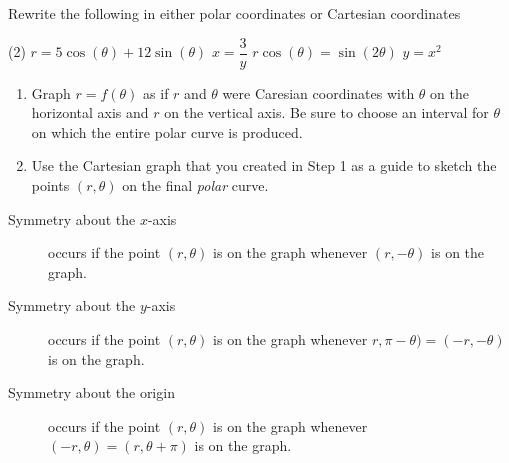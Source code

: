 \documentclass[../mathNotesPreamble]{subfiles}
\begin{document}
  \begin{ex*}
    Rewrite the following in either polar coordinates or Cartesian coordinates
  \end{ex*}
  \begin{tasks}[after-item-skip=\stretch{1}, label=,item-indent=0pt](2)
    \task $r=5\cos(\theta)+12\sin(\theta)$
    \task $x=\dfrac{3}{y}$
    \task $r\cos(\theta)=\sin(2\theta)$
    \task $y=x^2$
  \end{tasks}
  \pagebreak

  \begin{thmBox*}[Procedure: Cartesian-to-Polar Method for Graphing $r=f(\theta)$]
    \begin{enumerate}
      \item Graph $r=f(\theta)$ as if $r$ and $\theta$ were Caresian coordinates with $\theta$ on the horizontal axis and $r$ on the vertical axis. Be sure to choose an interval for $\theta$ on which the entire polar curve is produced.
      \item Use the Cartesian graph that you created in Step 1 as a guide to sketch the points $(r,\theta)$ on the final \textit{polar} curve.
    \end{enumerate}
  \end{thmBox*}

  \begin{thmBox*}
    \begin{description}
      \item[Symmetry about the $x$-axis] occurs if the point $(r,\theta)$ is on the graph whenever $(r,-\theta)$ is on the graph.
      \item[Symmetry about the $y$-axis] occurs if the point $(r,\theta)$ is on the graph whenever $r,\pi-\theta)=(-r,-\theta)$ is on the graph.
      \item[Symmetry about the origin] occurs if the point $(r,\theta)$ is on the graph whenever $(-r,\theta)=(r,\theta+\pi)$ is on the graph.
    \end{description}
  \end{thmBox*}
  \pagebreak
\end{document}
